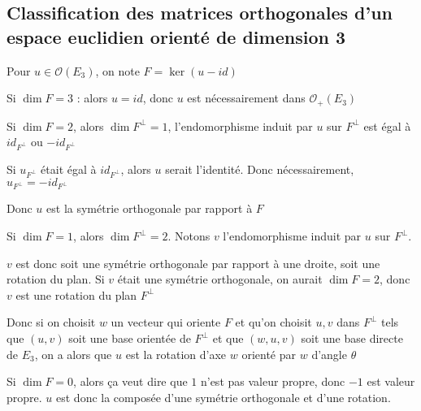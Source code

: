 \documentclass[a4paper,12pt]{book}
\begin{document}
\subsection{Classification des matrices orthogonales d'un espace euclidien orienté de dimension 3}
Pour $u\in\mathcal{O}(E_3)$, on note $F = \ker (u-id)$
\par Si $\dim F = 3$ : alors $u = id$, donc $u$ est nécessairement dans $\mathcal{O}_+(E_3)$
\par Si $\dim F=2$, alors $\dim F^\perp=1$, l'endomorphisme induit par $u$ sur $F^\perp$ est égal à $id_{F^\perp}$ ou $-id_{F^\perp}$
\par Si $u_{F^\perp}$ était égal à $id_{F^\perp}$, alors $u$ serait l'identité. Donc nécessairement, $u_{F^\perp} = -id_{F^\perp}$
\par Donc $u$ est la symétrie orthogonale par rapport à $F$
\par Si $\dim F=1$, alors $\dim F^\perp = 2$. Notons $v$ l'endomorphisme induit par $u$ sur $F^\perp$.
\par $v$ est donc soit une symétrie orthogonale par rapport à une droite, soit une rotation du plan. Si $v$ était une symétrie orthogonale, on aurait $\dim F = 2$, donc $v$ est une rotation du plan $F^\perp$
\par Donc si on choisit $w$ un vecteur qui oriente $F$ et qu'on choisit $u, v$ dans $F^\perp$ tels que $(u,v)$ soit une base orientée de $F^\perp$ et que $(w, u, v)$ soit une base directe de $E_3$, on a alors que $u$ est la rotation d'axe $w$ orienté par $w$ d'angle $\theta$
\par Si $\dim F=0$, alors ça veut dire que $1$ n'est pas valeur propre, donc $-1$ est valeur propre. $u$ est donc la composée d'une symétrie orthogonale et d'une rotation.
\end{document}
